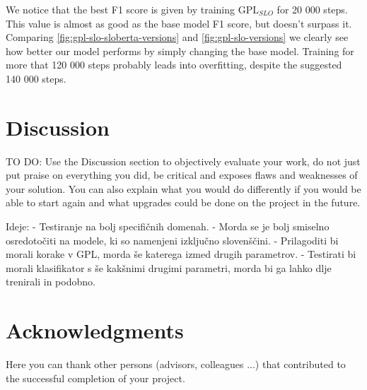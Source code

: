 \documentclass[fleqn,moreauthors,10pt]{ds_report}
\begin{document}

We notice that the best F1 score is given by training $\text{GPL}_{SLO}$ for 20 000 steps. This value is almost as good
as the base model F1 score, but doesn't surpass it. Comparing \ref*{fig:gpl-slo-sloberta-versions} and \ref*{fig:gpl-slo-versions}
we clearly see how better our model performs by simply changing the base model. Training for more that 120 000 steps probably
leads into overfitting, despite the suggested~\cite{GPL} 140 000 steps.






\section*{Discussion}

TO DO:
Use the Discussion section to objectively evaluate your work, do not just put praise on everything you did, be critical and exposes flaws and weaknesses of your solution. You can also explain what you would do differently if you would be able to start again and what upgrades could be done on the project in the future.

Ideje:
- Testiranje na bolj specifičnih domenah.
- Morda se je bolj smiselno osredotočiti na modele, ki so namenjeni izključno slovenščini.
- Prilagoditi bi morali korake v GPL, morda še katerega izmed drugih parametrov.
- Testirati bi morali klasifikator s še kakšnimi drugimi parametri, morda bi ga lahko dlje trenirali in podobno.




\section*{Acknowledgments}

Here you can thank other persons (advisors, colleagues ...) that contributed to the successful completion of your project.




\end{document}

